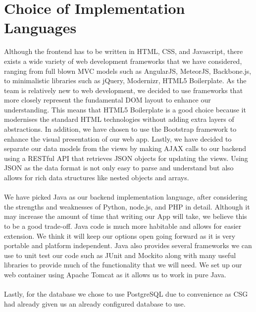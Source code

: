 \documentclass[10pt,a4paper]{article}
\begin{document}
\section{Choice of Implementation Languages}
Although the frontend has to be written in HTML, CSS, and Javascript, there exists a wide variety of web development frameworks that we have considered, ranging from full blown MVC models such as AngularJS, MeteorJS, Backbone.js, to minimalistic libraries such as jQuery, Modernizr, HTML5 Boilerplate. As the team is relatively new to web development, we decided to use frameworks that more closely represent the fundamental DOM layout to enhance our understanding. This means that HTML5 Boilerplate is a good choice because it modernises the standard HTML technologies without adding extra layers of abstractions. In addition, we have chosen to use the Bootstrap framework to enhance the visual presentation of our web app. Lastly, we have decided to separate our data models from the views by making AJAX calls to our backend using a RESTful API that retrieves JSON objects for updating the views. Using JSON as the data format is not only easy to parse and understand but also allows for rich data structures like nested objects and arrays.
\\
\\
\noindent
We have picked Java as our backend implementation language, after considering the strengths and weaknesses of Python, node.js, and PHP in detail.
Although it may increase the amount of time that writing our App will take, we believe this to be a good trade-off. Java code is much more habitable and allows for easier extension. We think it will keep our options open going forward as it is very portable and platform independent. Java also provides several frameworks we can use to unit test our code such as JUnit and Mockito along with many useful libraries to provide much of the functionality that we will need. We set up our web container using Apache Tomcat as it allows us to work in pure Java.
\\
\\
\noindent
Lastly, for the database we chose to use PostgreSQL due to convenience as CSG had already given us an already configured database to use.  
\end{document}
